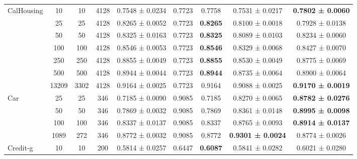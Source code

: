 \begin{table}
{\begin{tabular}[H]{@{}lcccccccc@{}}
                              \midrule
\multirow{7}{*}{CalHousing}   & 10    & 10   & 4128 & 0.7548 ± 0.0234      & 0.7723                & 0.7758          & 0.7531 ± 0.0217          & \textbf{0.7802 ± 0.0060} \\
                              & 25    & 25   & 4128 & 0.8265 ± 0.0052      & 0.7723                & \textbf{0.8265} & 0.8100 ± 0.0018          & 0.7928 ± 0.0138          \\
                              & 50    & 50   & 4128 & 0.8325 ± 0.0163      & 0.7723                & \textbf{0.8325} & 0.8089 ± 0.0103          & 0.8234 ± 0.0060          \\
                              & 100   & 100  & 4128 & 0.8546 ± 0.0053      & 0.7723                & \textbf{0.8546} & 0.8329 ± 0.0068          & 0.8427 ± 0.0070          \\
                              & 250   & 250  & 4128 & 0.8855 ± 0.0049      & 0.7723                & \textbf{0.8855} & 0.8530 ± 0.0049          & 0.8775 ± 0.0069          \\
                              & 500   & 500  & 4128 & 0.8944 ± 0.0044      & 0.7723                & \textbf{0.8944} & 0.8735 ± 0.0064          & 0.8900 ± 0.0064          \\
                              & 13209 & 3302 & 4128 & 0.9164 ± 0.0025      & 0.7723                & 0.9164          & 0.9088 ± 0.0025          & \textbf{0.9170 ± 0.0019} \\
                              \midrule
\multirow{4}{*}{Car}          & 25    & 25   & 346  & 0.7185 ± 0.0090      & 0.9085                & 0.7185          & 0.8270 ± 0.0065          & \textbf{0.8782 ± 0.0276} \\
                              & 50    & 50   & 346  & 0.7869 ± 0.0032      & 0.9085                & 0.7869          & 0.8361 ± 0.0148          & \textbf{0.8995 ± 0.0098} \\
                              & 100   & 100  & 346  & 0.8337 ± 0.0137      & 0.9085                & 0.8337          & 0.8765 ± 0.0093          & \textbf{0.8914 ± 0.0137} \\
                              & 1089  & 272  & 346  & 0.8772 ± 0.0032      & 0.9085                & 0.8772          & \textbf{0.9301 ± 0.0024} & 0.8774 ± 0.0026          \\
                              \midrule
\multirow{6}{*}{Credit-g}     & 10    & 10   & 200  & 0.5814 ± 0.0257      & 0.6447                & \textbf{0.6087} & 0.5841 ± 0.0282          & 0.6021 ± 0.0280          \\

\end{tabular}}
\end{table}

